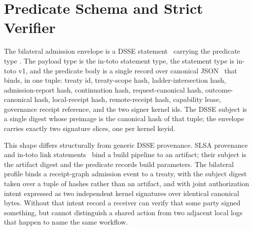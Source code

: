 \section{Predicate Schema and Strict Verifier}
\label{sec:predicate}

The bilateral admission envelope is a DSSE statement~\cite{dsse} carrying the predicate type . The payload type is the in-toto statement type, the statement type is in-toto v1, and the predicate body is a single record over canonical JSON~\cite{rfc8785} that binds, in one tuple: treaty id, treaty-scope hash, ladder-intersection hash, admission-report hash, continuation hash, request-canonical hash, outcome-canonical hash, local-receipt hash, remote-receipt hash, capability lease, governance receipt reference, and the two signer kernel ids. The DSSE subject is a single digest whose preimage is the canonical hash of that tuple; the envelope carries exactly two signature slices, one per kernel keyid.

This shape differs structurally from generic DSSE provenance. SLSA provenance and in-toto link statements~\cite{slsa,torres2019intoto} bind a build pipeline to an artifact; their subject is the artifact digest and the predicate records build parameters. The bilateral profile binds a receipt-graph admission event to a treaty, with the subject digest taken over a tuple of hashes rather than an artifact, and with joint authorization intent expressed as two independent kernel signatures over identical canonical bytes. Without that intent record a receiver can verify that some party signed something, but cannot distinguish a shared action from two adjacent local logs that happen to name the same workflow.

